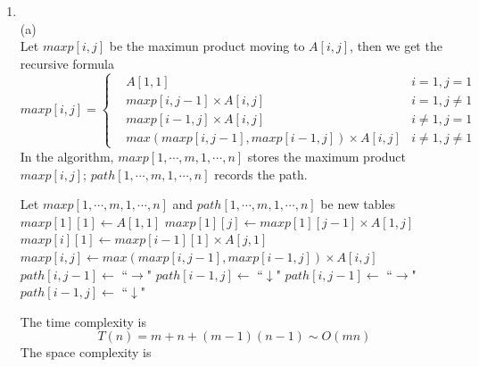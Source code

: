 \documentclass[12pt,a4paper]{article}
\makeatletter
\newtheorem*{solution}{Solution}
\theoremstyle{definition}
\renewenvironment{solution}[1][Solution] {\par\pushQED{\qed}\normalfont\topsep6\p@\@plus6\p@\relax\trivlist\item[\hskip\labelsep\bfseries#1\@addpunct{.}]\ignorespaces}{\popQED\endtrivlist\@endpefalse} \makeatother
\makeatother
\begin{document}
\begin{enumerate}
	\newpage
	    \begin{solution}
	        \quad \\
	        (a)\\
	        Let $maxp[i,j]$ be the maximun product moving to $A[i,j]$, then we get the recursive formula
	        $$
	        maxp[i,j] = \left\{
	        \begin{aligned}
	        	& A[1,1] & i = 1, j = 1 \\
	        	& maxp[i,j-1] \times A[i,j] & i = 1, j\neq 1 \\
	        	& maxp[i-1,j] \times A[i,j] & i\neq 1, j = 1 \\
	        	& max(maxp[i,j-1],maxp[i-1,j]) \times A[i,j] & i\neq 1, j\neq 1
	        \end{aligned}
	        \right.
	        $$
	        In the algorithm, 
	        $maxp[1,\cdots ,m,1,\cdots ,n]$ stores the maximum product $maxp[i,j]$;  $path[1,\cdots ,m,1,\cdots ,n]$ records the path. \\
	        \begin{algorithm}[H]
	        	\BlankLine
	        	\caption{$optPath\_nn(A_{m\times n})$} \label{Alg-div}
	        	Let $maxp[1,\cdots,m,1,\cdots,n]$ and $path[1,\cdots,m,1,\cdots,n]$ be new tables\;
	        	$maxp[1][1]\leftarrow A[1,1]$\; 
	        	{
	        		$maxp[1][j] \leftarrow maxp[1][j-1]\times A[1,j]$\;  
	        	}
        		{
        			$maxp[i][1] \leftarrow maxp[i-1][1]\times A[j,1]$\;  
        		}
        		{
        			{
        				$maxp[i,j] \leftarrow max(maxp[i,j-1],maxp[i-1,j]) \times A[i,j]$\;
        				{
        					$path[i, j-1] \leftarrow$ ``$\rightarrow$"\; 
        				}
        				{
        					$path[i-1, j] \leftarrow$ ``$\downarrow$"\; 
        				}
        				\Else
        				{
        					$path[i, j-1] \leftarrow$ ``$\rightarrow$"\; 
        					$path[i-1, j] \leftarrow$ ``$\downarrow$"\; 
        				}
        			}
        		}
	        	\;
	        \end{algorithm}
        	The time complexity is 
        	\[
        	T(n) = m + n + (m-1)(n-1) \sim O(mn)
        	\]
        	The space complexity is 

\end{solution}
\end{enumerate}
\end{document}
